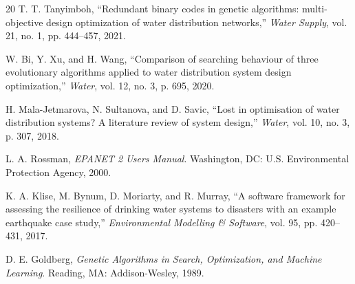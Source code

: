 \documentclass[conference]{IEEEtran}
\begin{document}
\begin{thebibliography}{20}
T. T. Tanyimboh, ``Redundant binary codes in genetic algorithms: multi-objective design optimization of water distribution networks,'' \emph{Water Supply}, vol. 21, no. 1, pp. 444--457, 2021.

W. Bi, Y. Xu, and H. Wang, ``Comparison of searching behaviour of three evolutionary algorithms applied to water distribution system design optimization,'' \emph{Water}, vol. 12, no. 3, p. 695, 2020.

H. Mala-Jetmarova, N. Sultanova, and D. Savic, ``Lost in optimisation of water distribution systems? A literature review of system design,'' \emph{Water}, vol. 10, no. 3, p. 307, 2018.

L. A. Rossman, \emph{EPANET 2 Users Manual}. Washington, DC: U.S. Environmental Protection Agency, 2000.

K. A. Klise, M. Bynum, D. Moriarty, and R. Murray, ``A software framework for assessing the resilience of drinking water systems to disasters with an example earthquake case study,'' \emph{Environmental Modelling \& Software}, vol. 95, pp. 420--431, 2017.

D. E. Goldberg, \emph{Genetic Algorithms in Search, Optimization, and Machine Learning}. Reading, MA: Addison-Wesley, 1989.

\end{thebibliography}
\end{document}
